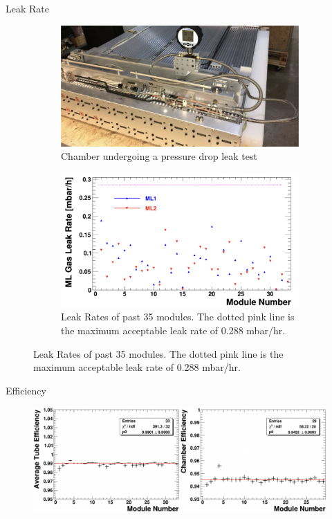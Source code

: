 		\begin{frame}{Leak Rate \ph}
			\begin{figure}
				\centering	
				\begin{subfigure}[t]{0.4\pdfpagewidth}
					\includegraphics[width=0.4\pdfpagewidth]{PressureGauge.png}
					\caption{Chamber undergoing a pressure drop leak test}
				\end{subfigure}
				\hfill
				\begin{subfigure}[t]{0.4\pdfpagewidth}
					\includegraphics[width=0.4\pdfpagewidth]{ChamberLeakRate.png}
					\caption{Leak Rates of past 35 modules. The dotted pink line is the maximum acceptable leak rate of 0.288 mbar/hr.}
				\end{subfigure}
			\end{figure}
		\end{frame}

		\begin{frame}{Efficiency \ph}
			\begin{figure}[t]
				\centering	
				\includegraphics[width=0.8\pdfpagewidth]{ChamberEfficiency.png}
				\label{fig:ChamberEfficiency}
			\end{figure}
		\end{frame}
		
